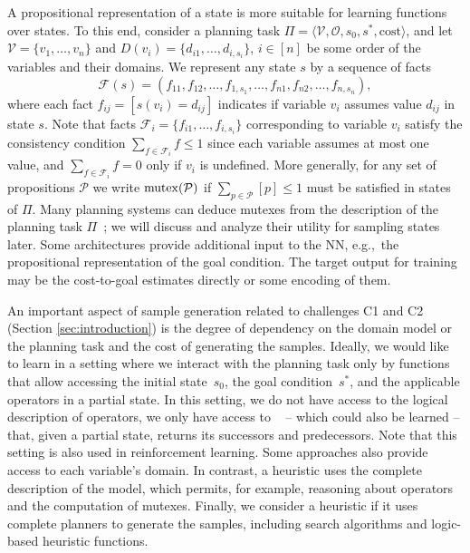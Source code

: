 A propositional representation of a state is more suitable for learning functions over states. To this end, consider a planning task $\Pi=\langle\mathcal{V},\mathcal{O},s_0,s^*, \text{cost}\rangle$, and let $\mathcal{V}=\{v_1,\ldots,v_n\}$ and $D(v_i)=\{d_{i1},\ldots,d_{i,s_i}\}$, $i\in[n]$ be some order of the variables and their domains. We represent any state $s$ by a sequence of facts $$\mathcal{F}(s)=(f_{11},f_{12},\ldots,f_{1,s_1},\ldots,f_{n1},f_{n2},\ldots,f_{n,s_n}),$$ where each fact $f_{ij}=[s(v_i)=d_{ij}]$ indicates if variable $v_i$ assumes value $d_{ij}$ in state $s$. Note that facts $\mathcal{F}_i=\{f_{i1},\ldots,f_{i,s_i}\}$ corresponding to variable $v_i$ satisfy the consistency condition $\sum_{f\in \mathcal{F}_i} f\leq 1$ since each variable assumes at most one value, and $\sum_{f\in \mathcal{F}_i} f=0$ only if $v_i$ is undefined. More generally, for any set of propositions $\mathcal{P}$ we write $\operatorname{mutex}(\mathcal{P})$ if $\sum_{p\in \mathcal{P}} [p]\leq 1$ must be satisfied in states of $\Pi$. Many planning systems can deduce mutexes from the description of the planning task $\Pi$~\cite{Helmert/2009}; we will discuss and analyze their utility for sampling states later. Some architectures provide additional input to the NN, e.g.,~the propositional representation of the goal condition. The target output for training may be the cost-to-goal estimates directly or some encoding of them.

An important aspect of sample generation related to challenges C1 and C2 (Section \ref{sec:introduction}) is the degree of dependency on the domain model or the planning task and the cost of generating the samples. Ideally, we would like to learn in a  setting where we interact with the planning task only by functions that allow accessing the initial state~$s_0$, the goal condition~$s^*$, and the applicable operators in a partial state. In this setting, we do not have access to the logical description of operators, we only have access to ~\cite{Sturtevant2019} -- which could also be learned -- that, given a partial state, returns its successors and predecessors. 
Note that this setting is also used in reinforcement learning.
Some approaches also provide access to each variable's domain. In contrast, a  heuristic uses the complete description of the model, which permits, for example, reasoning about operators and the computation of mutexes. Finally, we consider a heuristic  if it uses complete planners to generate the samples, including search algorithms and logic-based heuristic functions.

